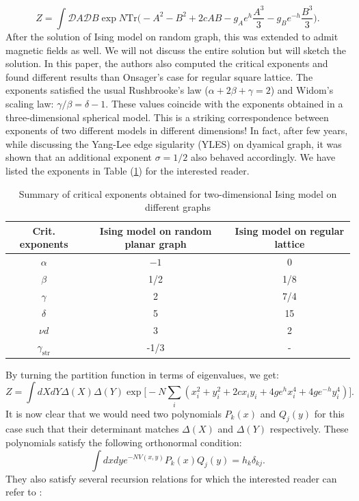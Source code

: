 \documentclass[letter,11pt]{article}
\begin{document}
\begin{equation}
	\label{eq:RIsing1} 
	Z = \int \mathcal{D}A \mathcal{D}B \exp N \mbox{Tr} \Bigg(-A^2 -B^2 + 2c AB -g_{A}e^{h} \frac{A^3}{3} 
	- g_{B}e^{-h} \frac{B^3}{3}  \Bigg). 
\end{equation}
After the solution of Ising model on random graph, this was extended to admit magnetic fields
\cite{Boulatov:1986sb} as well. We will not discuss the entire solution but will 
sketch the solution. In this paper, the authors also computed the critical exponents 
and found different results than Onsager's case for regular square lattice. 
The exponents satisfied the usual Rushbrooke's law ($\alpha + 2\beta+\gamma=2$) 
and Widom's scaling law: $\gamma/\beta = \delta -1$. 
These values coincide with the  exponents obtained in a three-dimensional spherical model. 
This is a striking correspondence between exponents of two different models in different dimensions! 
In fact, after few years, while discussing the Yang-Lee edge sigularity (YLES) on dyamical graph, 
it was shown that an additional exponent $\sigma =1/2$ 
also behaved accordingly. 
We have listed the exponents in Table (\ref{table:crit_exp}) for the interested reader.
\begin{table} 
	\begin{center} 
\begin{tabular}{|c|c|c|}
	\hline Crit. exponents & Ising model on random planar graph & Ising model on regular lattice \\
	\hline$\alpha$ & $-1$ & 0 \\
	$\beta$ & 1/2 & 1/8 \\
	$\gamma$ & 2 & 7/4 \\
	$\delta$ & 5 & 15 \\
	$\nu d$ & 3 & 2 \\
	$\gamma_{\text {str}}$ & -1/3 & - \\
	\hline
\end{tabular}
\end{center} 
	\caption{Summary of critical exponents obtained for two-dimensional Ising model on different graphs} 
	\label{table:crit_exp}
	\end{table} 
By turning the partition function in terms of eigenvalues, we get:
\begin{equation}
	Z = \int dX dY \Delta(X) \Delta(Y)
	 \exp \Big[-N \sum_{i} (x_{i}^2 + y_{i}^{2} +2c x_{i}y_{i} + 4ge^{h}x_{i}^{4} + 4ge^{-h}y_{i}^4) \Big].
	\end{equation}
It is now clear that we would need two polynomials $P_{k}(x)$ and $Q_{j}(y)$ for this case 
such that their determinant matches $\Delta(X)$ and $\Delta(Y)$ respectively. 
These polynomials satisfy the following orthonormal condition: 
\begin{equation}
\int dx dy e^{-N V(x,y)} P_{k}(x) Q_{j}(y) = h_{k} \delta_{kj}. 
\end{equation}
They also satisfy several recursion relations for which the interested reader can refer to 
\cite{Boulatov:1986sb}:
\end{document}
